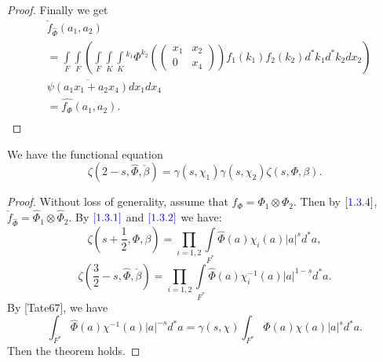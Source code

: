 \begin{proof}
Finally we get
\begin{equation*}
\begin{split}
&\check f_{\widehat \Phi}(a_1,a_2)\\
&=\int\limits_F\int\limits_F\left (\int\limits_F\int\limits_K \int\limits_K {^{k_1}\Phi^{k_2}} \left ( \left( \begin{array}{cc}
x_1 & x_2\\
0 & x_4
\end{array}
\right )\right )f_1(k_1)f_2(k_2)d^*k_1d^*k_2dx_2 \right )\\
&\overline{\psi(a_1x_1+a_2x_4)}dx_1 dx_4\\
&=\widehat {f_\Phi}(a_1,a_2).\\
\end{split}
\end{equation*}
\end{proof}

\begin{theorem}\label{6.3.2}
We have the functional equation
\[
\zeta(2-s,\widehat \Phi, \check \beta ) =\gamma(s,\chi_1) \gamma(s,\chi_2) \zeta(s,\Phi,\beta).
\]
\end{theorem}

\begin{proof}
Without loss of generality, assume that $f_{\Phi} =\Phi_1\otimes \Phi_2$. Then by $\textcolor{blue}{\ref{1.3.4}}$, $\check f_{\widehat \Phi} =\widehat \Phi_1\otimes \widehat \Phi_2$. By $\textcolor{blue}{\ref{1.3.1}}$ and $\textcolor{blue}{\ref{1.3.2}}$ we have:
\begin{equation*}
\zeta(s+\frac 1 2,\Phi, \beta)=\prod\limits_{i=1,2} \int\limits_{F^*} \widehat \Phi(a) \chi_i(a) \left | a \right |^{s} d^*a,
\end{equation*}
\begin{equation*}
\zeta(\frac 3 2-s,\widehat \Phi,\check \beta)=\prod\limits_{i=1,2} \int\limits_{F^*} \widehat \Phi(a) \chi_i^{-1} (a) \left | a \right |^{1-s} d^*a .
\end{equation*}
By [Tate67], we have 
\[
\int_{F^*} \widehat\Phi(a) \chi^{-1}(a) \left | a \right |^{-s} d^*a 
=
\gamma(s,\chi) \int_{F^*} \Phi(a) \chi(a) \left | a \right |^s d^*a.
\]
Then the theorem holds.
\end{proof}

